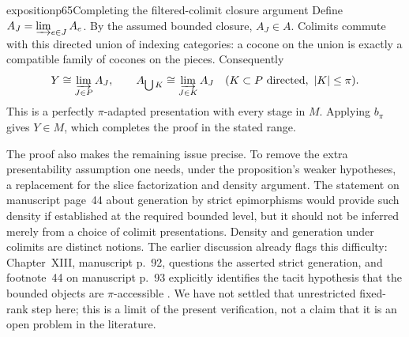 \begin{dcomment}{exposition}{p65}{Completing the filtered-colimit closure argument}
Define $A_J=\varinjlim_{e\in J}A_e$. By the assumed bounded closure, $A_J\in A$. Colimits commute with this directed union of indexing categories: a cocone on the union is exactly a compatible family of cocones on the pieces. Consequently
\[
 Y\cong\varinjlim_{J\in P}A_J,
 \qquad
 A_{\bigcup K}\cong\varinjlim_{J\in K}A_J
 \quad(K\subset P\text{ directed},\ |K|\leq\pi).
\]
This is a perfectly $\pi$-adapted presentation with every stage in $M$. Applying $b_\pi$ gives $Y\in M$, which completes the proof in the stated range.

The proof also makes the remaining issue precise. To remove the extra presentability assumption one needs, under the proposition's weaker hypotheses, a replacement for the slice factorization and density argument. The statement on manuscript page~44 about generation by strict epimorphisms would provide such density if established at the required bounded level, but it should not be inferred merely from a choice of colimit presentations. Density and generation under colimits are distinct notions. The earlier discussion already flags this difficulty: Chapter~XIII, manuscript p.~92, questions the asserted strict generation, and footnote~44 on manuscript p.~93 explicitly identifies the tacit hypothesis that the bounded objects are $\pi$-accessible \citep{GrothendieckDerivateursXIII}. We have not settled that unrestricted fixed-rank step here; this is a limit of the present verification, not a claim that it is an open problem in the literature.
\end{dcomment}

